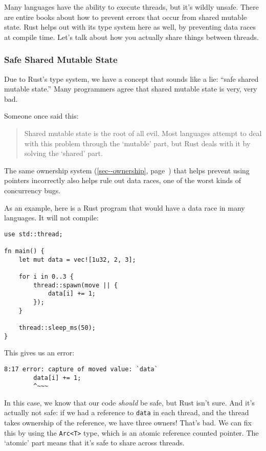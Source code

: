 \documentclass[a4paper,]{book}
\renewcommand*{\hyperref}[2][\ar]{%
  \def\ar{#2}%
  #2 (\autoref{#1}, page~\pageref{#1})}
\begin{document}
Many languages have the ability to execute threads, but it's wildly
unsafe. There are entire books about how to prevent errors that occur
from shared mutable state. Rust helps out with its type system here as
well, by preventing data races at compile time. Let's talk about how you
actually share things between threads.

\subsubsection{Safe Shared Mutable
State}\label{safe-shared-mutable-state}

Due to Rust's type system, we have a concept that sounds like a lie:
``safe shared mutable state.'' Many programmers agree that shared
mutable state is very, very bad.

Someone once said this:

\begin{quote}
Shared mutable state is the root of all evil. Most languages attempt to
deal with this problem through the `mutable' part, but Rust deals with
it by solving the `shared' part.
\end{quote}

The same \hyperref[sec--ownership]{ownership system} that helps prevent
using pointers incorrectly also helps rule out data races, one of the
worst kinds of concurrency bugs.

As an example, here is a Rust program that would have a data race in
many languages. It will not compile:

\begin{verbatim}
use std::thread;

fn main() {
    let mut data = vec![1u32, 2, 3];

    for i in 0..3 {
        thread::spawn(move || {
            data[i] += 1;
        });
    }

    thread::sleep_ms(50);
}
\end{verbatim}

This gives us an error:

\begin{verbatim}
8:17 error: capture of moved value: `data`
        data[i] += 1;
        ^~~~
\end{verbatim}

In this case, we know that our code \emph{should} be safe, but Rust
isn't sure. And it's actually not safe: if we had a reference to
\texttt{data} in each thread, and the thread takes ownership of the
reference, we have three owners! That's bad. We can fix this by using
the \texttt{Arc\textless{}T\textgreater{}} type, which is an atomic
reference counted pointer. The `atomic' part means that it's safe to
share across threads.
\end{document}
